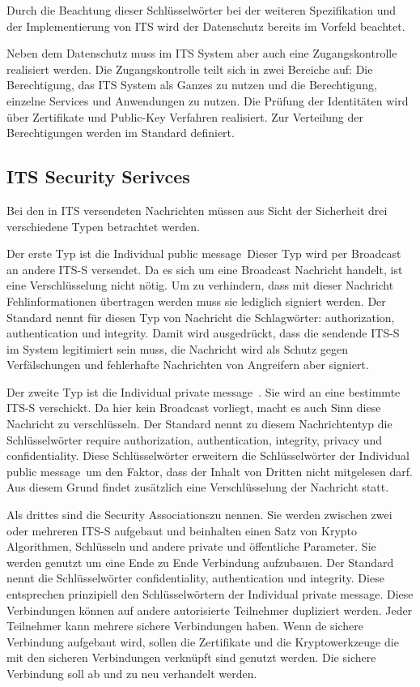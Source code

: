 Durch die Beachtung dieser Schlüsselwörter bei der weiteren Spezifikation und der Implementierung von \ac{ITS} wird der Datenschutz bereits im Vorfeld beachtet. 

Neben dem Datenschutz muss im \ac{ITS} System aber auch eine Zugangskontrolle realisiert werden. Die Zugangskontrolle teilt sich in zwei Bereiche auf: Die Berechtigung, das \ac{ITS} System als Ganzes zu nutzen und die Berechtigung, einzelne Services und Anwendungen zu nutzen. Die Prüfung der Identitäten wird über Zertifikate und Public-Key Verfahren realisiert. Zur Verteilung der Berechtigungen werden im Standard \cite{ts102731} definiert.

\subsection{ITS Security Serivces}
Bei den in \ac{ITS} versendeten Nachrichten müssen aus Sicht der Sicherheit drei verschiedene Typen betrachtet werden. 

Der erste Typ ist die \glqq Individual public message\grqq~Dieser Typ wird per Broadcast an andere \ac{ITS-S} versendet. Da es sich um eine Broadcast Nachricht handelt, ist eine Verschlüsselung nicht nötig. Um zu verhindern, dass mit dieser Nachricht Fehlinformationen übertragen werden muss sie lediglich signiert werden. Der Standard \cite{ts102731} nennt für diesen Typ von Nachricht die Schlagwörter: authorization, authentication und integrity. Damit wird ausgedrückt, dass die sendende \ac{ITS-S} im System legitimiert sein muss, die Nachricht wird als Schutz gegen Verfälschungen und fehlerhafte Nachrichten von Angreifern aber signiert.

Der zweite Typ ist die \glqq    Individual private message\grqq~. Sie wird an eine bestimmte \ac{ITS-S} verschickt. Da hier kein Broadcast vorliegt, macht es auch Sinn diese Nachricht zu verschlüsseln. Der Standard nennt zu diesem Nachrichtentyp die Schlüsselwörter require authorization, authentication, integrity, privacy und confidentiality. Diese Schlüsselwörter erweitern die Schlüsselwörter der \glqq Individual public message\grqq~um den Faktor, dass der Inhalt von Dritten nicht mitgelesen darf. Aus diesem Grund findet zusätzlich eine Verschlüsselung der Nachricht statt.

Als drittes sind die \glqq Security Associations\grqq zu nennen. Sie werden zwischen zwei oder mehreren \ac{ITS-S} aufgebaut und beinhalten einen Satz von Krypto Algorithmen, Schlüsseln und andere private und öffentliche Parameter. Sie werden genutzt um eine Ende zu Ende Verbindung aufzubauen.  Der Standard nennt die Schlüsselwörter confidentiality, authentication und integrity.  Diese entsprechen prinzipiell den Schlüsselwörtern der \glqq    Individual private message\grqq. Diese Verbindungen können auf andere autorisierte Teilnehmer dupliziert werden. Jeder Teilnehmer kann mehrere sichere Verbindungen haben. Wenn de sichere Verbindung aufgebaut wird, sollen die Zertifikate und die Kryptowerkzeuge die mit den sicheren Verbindungen verknüpft sind genutzt werden. Die sichere Verbindung soll ab und zu neu verhandelt werden. 

